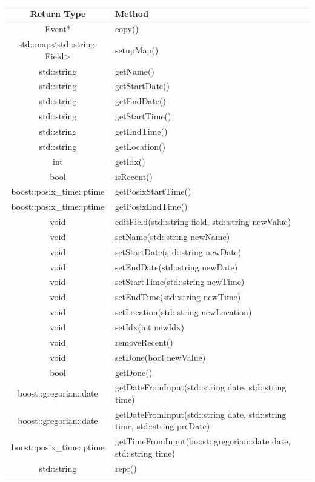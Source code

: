 \documentclass[12pt]{extarticle}
\begin{document}
\begin{tabular}{c p{8.5cm}}
Return Type & Method\\
\hline
Event* & copy()\\
std::map<std::string, Field> & setupMap()\\
std::string & getName()\\
std::string & getStartDate()\\
std::string & getEndDate()\\
std::string & getStartTime()\\
std::string & getEndTime()\\
std::string & getLocation()\\
int & getIdx()\\
bool & isRecent()\\
boost::posix\_time::ptime & getPosixStartTime()\\
boost::posix\_time::ptime & getPosixEndTime()\\
void & editField(std::string field, std::string newValue)\\
void & setName(std::string newName)\\
void & setStartDate(std::string newDate)\\
void & setEndDate(std::string newDate)\\
void & setStartTime(std::string newTime)\\
void & setEndTime(std::string newTime)\\
void & setLocation(std::string newLocation)\\
void & setIdx(int newIdx)\\
void & removeRecent()\\
void & setDone(bool newValue)\\
bool & getDone()\\
boost::gregorian::date & getDateFromInput(std::string date, std::string time)\\
boost::gregorian::date & getDateFromInput(std::string date,  std::string time, std::string preDate)\\
boost::posix\_time::ptime & getTimeFromInput(boost::gregorian::date date, std::string time)\\
std::string & repr()\\
\end{tabular}
\end{document}
